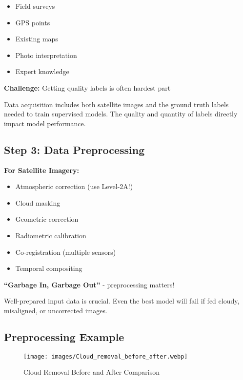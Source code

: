 \documentclass[
  letterpaper,
  DIV=11,
  numbers=noendperiod]{scrartcl}
\providecommand{\tightlist}{%
  \setlength{\itemsep}{0pt}\setlength{\parskip}{0pt}}
\begin{document}
\begin{itemize}
\tightlist
\item
  Field surveys
\item
  GPS points
\item
  Existing maps
\item
  Photo interpretation
\item
  Expert knowledge
\end{itemize}

\textbf{Challenge:} Getting quality labels is often hardest part

Data acquisition includes both satellite images and the ground truth
labels needed to train supervised models. The quality and quantity of
labels directly impact model performance.

\subsection{Step 3: Data Preprocessing}\label{step-3-data-preprocessing}

\textbf{For Satellite Imagery:}

\begin{itemize}
\tightlist
\item
  Atmospheric correction (use Level-2A!)
\item
  Cloud masking
\item
  Geometric correction
\item
  Radiometric calibration
\item
  Co-registration (multiple sensors)
\item
  Temporal compositing
\end{itemize}

\textbf{``Garbage In, Garbage Out''} - preprocessing matters!

Well-prepared input data is crucial. Even the best model will fail if
fed cloudy, misaligned, or uncorrected images.

\subsection{Preprocessing Example}\label{preprocessing-example}

\begin{figure}[H]

{\centering \texttt{[image: images/Cloud\_removal\_before\_after.webp]}

}

\caption{Cloud Removal Before and After Comparison}

\end{figure}%
\end{document}

